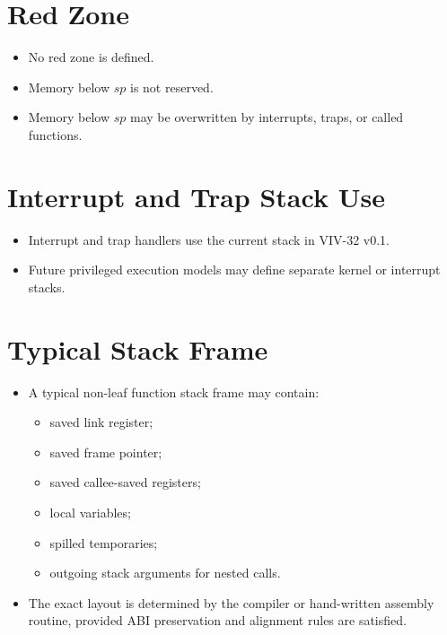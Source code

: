 \section{Red Zone}

\begin{itemize}
  \item No red zone is defined.
  \item Memory below \(sp\) is not reserved.
  \item Memory below \(sp\) may be overwritten by interrupts, traps, or called functions.
\end{itemize}

\section{Interrupt and Trap Stack Use}

\begin{itemize}
  \item Interrupt and trap handlers use the current stack in VIV-32 v0.1.
  \item Future privileged execution models may define separate kernel or interrupt stacks.
\end{itemize}

\section{Typical Stack Frame}

\begin{itemize}
  \item A typical non-leaf function stack frame may contain:
  \begin{itemize}
    \item saved link register;
    \item saved frame pointer;
    \item saved callee-saved registers;
    \item local variables;
    \item spilled temporaries;
    \item outgoing stack arguments for nested calls.
  \end{itemize}
  \item The exact layout is determined by the compiler or hand-written assembly routine, provided ABI preservation and alignment rules are satisfied.
\end{itemize}
